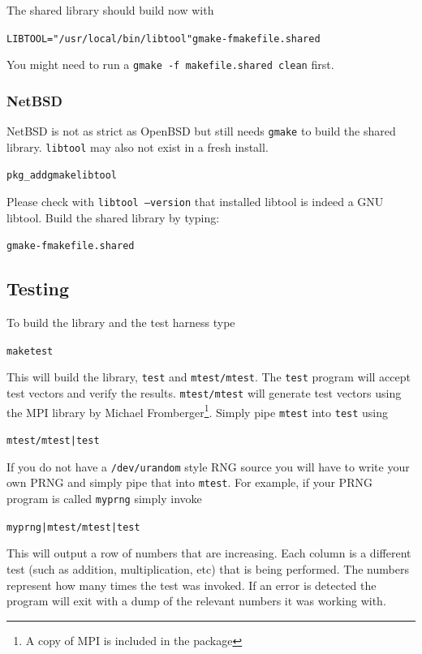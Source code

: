 \documentclass[synpaper]{book}
\begin{document}
The shared library should build now with
\begin{alltt}
LIBTOOL="/usr/local/bin/libtool" gmake -f makefile.shared
\end{alltt}
You might need to run a \texttt{gmake -f makefile.shared clean} first.

\subsubsection{NetBSD}
NetBSD is not as strict as OpenBSD but still needs \texttt{gmake} to build the shared library.
\texttt{libtool} may also not exist in a fresh install.
\begin{alltt}
pkg_add gmake libtool
\end{alltt}
Please check with \texttt{libtool --version} that installed libtool is indeed a GNU libtool.
Build the shared library by typing:
\begin{alltt}
gmake -f makefile.shared
\end{alltt}

\subsection{Testing}
To build the library and the test harness type

\begin{alltt}
make test
\end{alltt}

This will build the library, \texttt{test} and \texttt{mtest/mtest}.  The \texttt{test} program
will accept test vectors and verify the results.  \texttt{mtest/mtest} will generate test vectors
using the MPI library by Michael Fromberger\footnote{A copy of MPI is included in the package}.
Simply pipe \texttt{mtest} into \texttt{test} using

\begin{alltt}
mtest/mtest | test
\end{alltt}

If you do not have a \texttt{/dev/urandom} style RNG source you will have to write your own PRNG
and simply pipe that into \texttt{mtest}.  For example, if your PRNG program is called
\texttt{myprng} simply invoke

\begin{alltt}
myprng | mtest/mtest | test
\end{alltt}

This will output a row of numbers that are increasing.	Each column is a different test (such as
addition, multiplication, etc) that is being performed.  The numbers represent how many times the
test was invoked.  If an error is detected the program will exit with a dump of the relevant
numbers it was working with.
\end{document}

